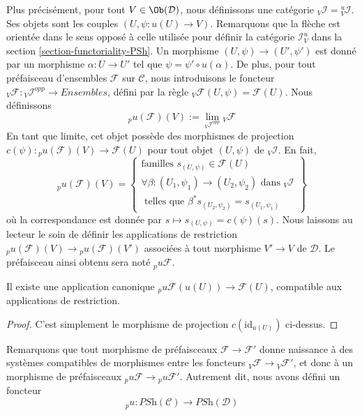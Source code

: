 \medskip\noindent
Plus précisément, pour tout $V \in \Ob(\mathcal{D})$,
nous définissons une catégorie ${}_V\mathcal{I} = {}_V^u\mathcal{I}$.
Ses objets sont les couples $(U, \psi : u(U) \to V)$.
Remarquons que la flèche est orientée dans le sens opposé à celle utilisée
pour définir la catégorie $\mathcal{I}_V^u$ dans la
section \ref{section-functoriality-PSh}.
Un morphisme $(U, \psi) \to (U', \psi')$ est donné par un morphisme
$\alpha : U \to U'$ tel que $\psi = \psi' \circ u(\alpha)$.
De plus, pour tout préfaisceau d’ensembles $\mathcal{F}$ sur $\mathcal{C}$,
nous introduisons le foncteur
${}_V\mathcal{F} : {}_V\mathcal{I}^{opp} \to \textit{Ensembles}$,
défini par la règle ${}_V\mathcal{F}(U, \psi) = \mathcal{F}(U)$.
Nous définissons
$$
{}_pu(\mathcal{F})(V) := \lim_{{}_V\mathcal{I}^{opp}} {}_V\mathcal{F}
$$
En tant que limite, cet objet possède des morphismes de projection
$c(\psi) : {}_pu(\mathcal{F})(V) \to \mathcal{F}(U)$
pour tout objet $(U, \psi)$ de ${}_V\mathcal{I}$.
En fait,
$$
{}_pu(\mathcal{F})(V)
=
\left\{
\begin{matrix}
\text{familles }
s_{(U, \psi)} \in \mathcal{F}(U) \\
\forall \beta : (U_1, \psi_1) \to (U_2, \psi_2)
\text{ dans }{}_V\mathcal{I} \\
\text{ telles que } \beta^*s_{(U_2, \psi_2)} = s_{(U_1, \psi_1)}
\end{matrix}
\right\}
$$
où la correspondance est donnée par
$s \mapsto s_{(U, \psi)} = c(\psi)(s)$.
Nous laissons au lecteur le soin de définir les applications de restriction
${}_pu(\mathcal{F})(V) \to {}_pu(\mathcal{F})(V')$
associées à tout morphisme $V' \to V$ de $\mathcal{D}$.
Le préfaisceau ainsi obtenu sera noté ${}_pu\mathcal{F}$.

\begin{lemma}
\label{lemma-recover-pu}
Il existe une application canonique
${}_pu\mathcal{F}(u(U)) \to \mathcal{F}(U)$,
compatible aux applications de restriction.
\end{lemma}

\begin{proof}
C’est simplement le morphisme de projection $c(\text{id}_{u(U)})$ ci-dessus.
\end{proof}

\noindent
Remarquons que tout morphisme de préfaisceaux
$\mathcal{F} \to \mathcal{F}'$ donne naissance à des systèmes compatibles
de morphismes entre les foncteurs
${}_V\mathcal{F} \to {}_V\mathcal{F}'$, et donc à un morphisme de préfaisceaux
${}_pu\mathcal{F} \to {}_pu\mathcal{F}'$.
Autrement dit, nous avons défini un foncteur
$$
{}_pu :
\textit{PSh}(\mathcal{C})
\longrightarrow
\textit{PSh}(\mathcal{D})
$$


